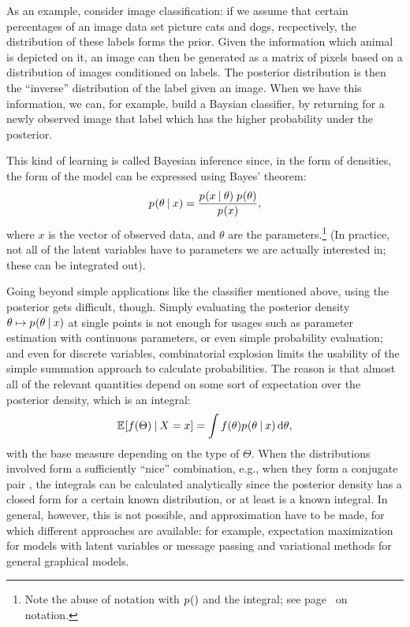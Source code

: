 As an example, consider image classification: if we assume that certain percentages of an image data
set picture cats and dogs, recpectively, the distribution of these labels forms the prior.  Given
the information which animal is depicted on it, an image can then be generated as a matrix of pixels
based on a distribution of images conditioned on labels.  The posterior distribution is then the
``inverse'' distribution of the label given an image.  When we have this information, we can, for
example, build a Baysian classifier, by returning for a newly observed image that label which has
the higher probability under the posterior.

This kind of learning is called Bayesian inference since, in the form of densities, the form of the
model can be expressed using Bayes' theorem:
\begin{equation}
  \label{eq:bayes}
  \prob{\theta \given x} = \frac{\prob{x \given \theta}\; \prob{\theta}}{\prob{x}},
\end{equation}
where \(x\) is the vector of observed data, and \(\theta\) are the parameters.\footnote{Note the
  abuse of notation with \(\prob{}\) and the integral; see page~\pageref{cha:notation} on notation.}
(In practice, not all of the latent variables have to parameters we are actually interested in;
these can be integrated out).

Going beyond simple applications like the classifier mentioned above, using the posterior gets
difficult, though.  Simply evaluating the posterior density
\(\theta \mapsto \prob{\theta \given x}\) at single points is not enough for usages such as
parameter estimation with continuous parameters, or even simple probability evaluation; and even for
discrete variables, combinatorial explosion limits the usability of the simple summation approach to
calculate probabilities.  The reason is that almost all of the relevant quantities depend on some
sort of expectation over the posterior density, which is an integral:
\begin{equation}
  \label{eq:posterior-expectation}
  \Exp{f(\Theta) \given X = x} = \int f(\theta) \prob{\theta \given x} \dif \theta,
\end{equation}
with the base measure depending on the type of \(\Theta\).  When the distributions involved form a
sufficiently \enquote{nice} combination, e.g., when they form a conjugate pair , the
integrals can be calculated analytically since the posterior density has a closed form for a certain
known distribution, or at least is a known integral.  In general, however, this is not possible, and
approximation have to be made, for which different approaches are available: for example,
expectation maximization for models with latent variables or message passing and
variational methods for general graphical models.

